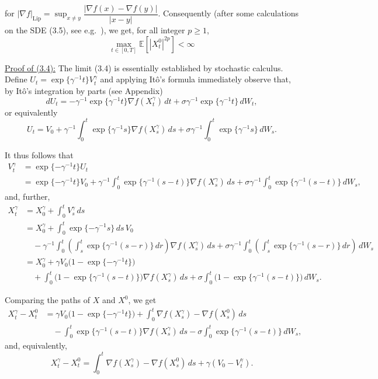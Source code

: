 \documentclass[11pt]{article}
\theoremstyle{remark}
\begin{document}

for $|\nabla f|_{\mathrm{Lip}}=\sup_{x\neq y}\dfrac{|\nabla f(x)-\nabla f(y)|}{|x-y|}$. Consequently (after some calculations on the SDE (3.5), see e.g.~\cite{4}), we get, for all integer $p\ge1$,
\begin{equation}
\max_{t\in[0,T]}\mathbb{E}\!\left[|X_t^0|^{2p}\right]<\infty
\tag{3.8}
\end{equation}

\underline{Proof of (3.4):}
The limit (3.4) is essentially established by stochastic calculus. Define $U_t=\exp\{\gamma^{-1}t\}V_t^\gamma$ and applying It\^o's formula immediately observe that, by It\^o's integration by parts (see Appendix)
\[
dU_t=-\gamma^{-1}\exp\{\gamma^{-1}t\}\nabla f(X_t^\gamma)\,dt+\sigma\gamma^{-1}\exp\{\gamma^{-1}t\}\,dW_t,
\]
or equivalently
\[
U_t=V_0+\gamma^{-1}\int_0^t \exp\{\gamma^{-1}s\}\nabla f(X_s^\gamma)\,ds+\sigma\gamma^{-1}\int_0^t \exp\{\gamma^{-1}s\}\,dW_s.
\]

It thus follows that
\begin{equation}
\begin{aligned}
V_t^\gamma &= \exp\{-\gamma^{-1}t\}U_t \\
&= \exp\{-\gamma^{-1}t\}V_0+\gamma^{-1}\int_0^t \exp\{\gamma^{-1}(s-t)\}\nabla f(X_s^\gamma)\,ds+\sigma\gamma^{-1}\int_0^t \exp\{\gamma^{-1}(s-t)\}\,dW_s,
\end{aligned}
\tag{3.9}
\end{equation}
and, further,
\[
\begin{aligned}
X_t^\gamma &= X_0^\gamma+\int_0^t V_s^\gamma\,ds \\
&= X_0^\gamma+\int_0^t \exp\{-\gamma^{-1}s\}\,ds\,V_0 \\
&\quad -\gamma^{-1}\int_0^t \left(\int_s^t \exp\{\gamma^{-1}(s-r)\}\,dr\right)\nabla f(X_s^\gamma)\,ds+\sigma\gamma^{-1}\int_0^t \left(\int_s^t \exp\{\gamma^{-1}(s-r)\}\,dr\right)\,dW_s \\
&= X_0^\gamma+\gamma V_0\bigl(1-\exp\{-\gamma^{-1}t\}\bigr) \\
&\quad +\int_0^t \bigl(1-\exp\{\gamma^{-1}(s-t)\}\bigr)\nabla f(X_s^\gamma)\,ds+\sigma\int_0^t \bigl(1-\exp\{\gamma^{-1}(s-t)\}\bigr)\,dW_s.
\end{aligned}
\]

Comparing the paths of $X$ and $X^0$, we get
\begin{equation}
\begin{aligned}
X_t^\gamma-X_t^0
&= \gamma V_0\bigl(1-\exp\{-\gamma^{-1}t\}\bigr)+\int_0^t \nabla f(X_s^\gamma)-\nabla f(X_s^0)\,ds \\
&\quad -\int_0^t \exp\{\gamma^{-1}(s-t)\}\nabla f(X_s^\gamma)\,ds-\sigma\int_0^t \exp\{\gamma^{-1}(s-t)\}\,dW_s,
\end{aligned}
\tag{3.10}
\end{equation}
and, equivalently,
\[
X_t^\gamma-X_t^0=\int_0^t \nabla f(X_s^\gamma)-\nabla f(X_s^0)\,ds+\gamma(V_0-V_t^\gamma).
\]
\end{document}
